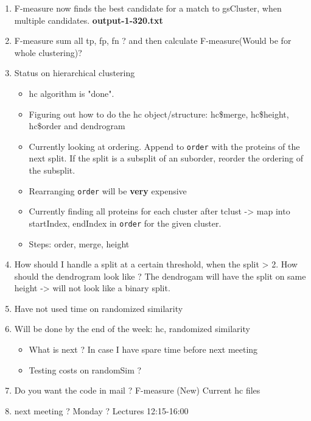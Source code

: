 \documentclass[a4paper,10pt]{article}
\begin{document}
\begin{enumerate}
	\item F-measure now finds the best candidate for a match to gsCluster, when multiple candidates. \textbf{output-1-320.txt}
	
	\item F-measure sum all tp, fp, fn ? and then calculate F-measure(Would be for whole clustering)?
	
	\item Status on hierarchical clustering
	\begin{itemize}
		\item hc algorithm is "done".
		\item Figuring out how to do the hc object/structure: hc\$merge, hc\$height, hc\$order and dendrogram
		\item Currently looking at ordering. Append to \texttt{order} with the proteins of the next split. If the split is a subsplit of an suborder, reorder the ordering of the subsplit.
		\item Rearranging \texttt{order} will be \textbf{very} expensive
		\item Currently finding all proteins for each cluster after tclust -> map into startIndex, endIndex in \texttt{order} for the given cluster.
		\item Steps: order, merge, height
	\end{itemize}
	
	\item How should I handle a split at a certain threshold, when the split > 2. How should the dendrogram look like ?
	The dendrogam will have the split on same height -> will not look like a binary split.
	
	\item Have not used time on randomized similarity
	
	\item Will be done by the end of the week: hc, randomized similarity
	\begin{itemize}
		\item What is next ? In case I have spare time before next meeting
		\item Testing costs on randomSim ?
	\end{itemize}
	
	
	\item Do you want the code in mail ?
	\subitem F-measure (New)
	\subitem Current hc files
	
	\item next meeting ? Monday ? Lectures 12:15-16:00
\end{enumerate}
\end{document}
